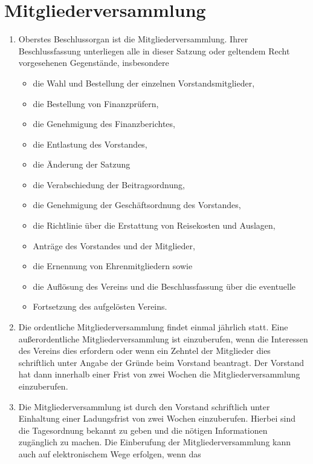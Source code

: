 \documentclass[10pt,a4paper]{scrartcl}
\begin{document}
\section{Mitgliederversammlung}

\begin{enumerate}[label=(\arabic*)]
\item
  Oberstes Beschlussorgan ist die Mitgliederversammlung. Ihrer Beschlussfassung
  unterliegen alle in dieser Satzung oder geltendem Recht vorgesehenen Gegenstände,
  insbesondere
  \begin{itemize}
  \item
    die Wahl und Bestellung der einzelnen Vorstandsmitglieder,
  \item
    die Bestellung von Finanzprüfern,
  \item
    die Genehmigung des Finanzberichtes,
  \item
    die Entlastung des Vorstandes,
  \item
    die Änderung der Satzung
  \item
    die Verabschiedung der Beitragsordnung,
  \item
    die Genehmigung der Geschäftsordnung des Vorstandes,
  \item
    die Richtlinie über die Erstattung von Reisekosten und Auslagen,
  \item
    Anträge des Vorstandes und der Mitglieder,
  \item
    die Ernennung von Ehrenmitgliedern sowie
  \item
    die Auflösung des Vereins und die Beschlussfassung über die eventuelle
  \item
    Fortsetzung des aufgelösten Vereins.
  \end{itemize}
\item
  Die ordentliche Mitgliederversammlung findet einmal jährlich statt. Eine
  außerordentliche Mitgliederversammlung ist einzuberufen, wenn die Interessen des
  Vereins dies erfordern oder wenn ein Zehntel der Mitglieder dies schriftlich unter
  Angabe der Gründe beim Vorstand beantragt. Der Vorstand hat dann innerhalb einer
  Frist von zwei Wochen die Mitgliederversammlung einzuberufen.
\item
  Die Mitgliederversammlung ist durch den Vorstand schriftlich unter Einhaltung einer
  Ladungsfrist von zwei Wochen einzuberufen. Hierbei sind die Tagesordnung bekannt
  zu geben und die nötigen Informationen zugänglich zu machen. Die Einberufung der
  Mitgliederversammlung kann auch auf elektronischem Wege erfolgen, wenn das

\end{enumerate}
\end{document}
